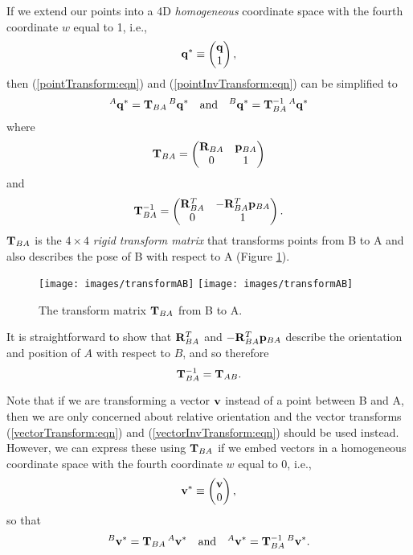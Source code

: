 If we extend our points into a 4D {\it homogeneous} coordinate space
with the fourth coordinate $w$ equal to 1, i.e.,
%
\begin{equation}
{\bf q}^* \equiv \left(\begin{matrix} {\bf q} \\ 1 \end{matrix}\right),
\end{equation}
%
then (\ref{pointTransform:eqn}) and
(\ref{pointInvTransform:eqn}) can be simplified to
%
\begin{equation*}
{}^A{\bf q}^* = {\bf T}_{BA} \, {}^B{\bf q}^* \quad \text{and} \quad
{}^B{\bf q}^* = {\bf T}_{BA}^{-1} \, {}^A{\bf q}^*
\end{equation*}
%
where
%
\begin{equation}
{\bf T}_{BA} = \left(\begin{matrix} {\bf R}_{BA} & {\bf p}_{BA} \\ 0 & 1 \end{matrix}\right)
\end{equation}
%
and
%
\begin{equation}
{\bf T}_{BA}^{-1} = \left(\begin{matrix} {\bf R}_{BA}^T & -{\bf R}_{BA}^T {\bf p}_{BA} \\ 0 & 1 \end{matrix}\right).
\end{equation}
%
${\bf T}_{BA}$ is the $4 \times 4$ {\it rigid transform matrix} that
transforms points from B to A and also describes the pose of
B with respect to A (Figure \ref{transformAB:fig}).

\begin{figure}[t]
\begin{center}
 \iflatexml
   \texttt{[image: images/transformAB]}
 \else
   \texttt{[image: images/transformAB]}
 \fi
\end{center}
\caption{The transform matrix ${\bf T}_{BA}$ from B to A.}
\label{transformAB:fig}
\end{figure}

It is straightforward to show that ${\bf R}_{BA}^T$ and $-{\bf R}_{BA}^T
{\bf p}_{BA}$ describe the orientation and position of $A$ with respect to
$B$, and so therefore
%
\begin{equation}
{\bf T}_{BA}^{-1} = {\bf T}_{AB}.
\label{transformInverse:eqn}
\end{equation}
%

Note that if we are transforming a vector ${\bf v}$ instead of a point
between B and A, then we are only concerned about relative orientation
and the vector transforms (\ref{vectorTransform:eqn}) and
(\ref{vectorInvTransform:eqn}) should be used instead.
However, we can express these using ${\bf T}_{BA}$ if
we embed vectors in a homogeneous coordinate space 
with the fourth coordinate $w$ equal to 0, i.e.,
%
\begin{equation}
{\bf v}^* \equiv \left(\begin{matrix} {\bf v} \\ 0 \end{matrix}\right),
\end{equation}
%
so that
%
\begin{equation*}
{}^B{\bf v}^* = {\bf T}_{BA} \, {}^A{\bf v}^* \quad \text{and} \quad
{}^A{\bf v}^* = {\bf T}_{BA}^{-1} \, {}^B{\bf v}^*.
\end{equation*}
%

